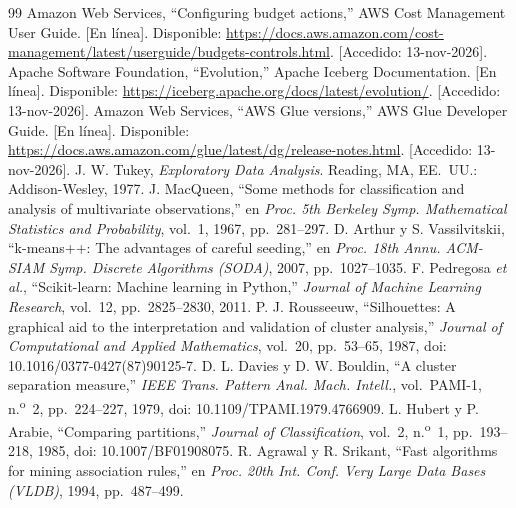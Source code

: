 \begin{thebibliography}{99}
 Amazon Web Services, ``Configuring budget actions,'' AWS Cost Management User Guide. [En línea]. Disponible: \url{https://docs.aws.amazon.com/cost-management/latest/userguide/budgets-controls.html}. [Accedido: 13-nov-2026].
 Apache Software Foundation, ``Evolution,'' Apache Iceberg Documentation. [En línea]. Disponible: \url{https://iceberg.apache.org/docs/latest/evolution/}. [Accedido: 13-nov-2026].
 Amazon Web Services, ``AWS Glue versions,'' AWS Glue Developer Guide. [En línea]. Disponible: \url{https://docs.aws.amazon.com/glue/latest/dg/release-notes.html}. [Accedido: 13-nov-2026].
 J. W. Tukey, \emph{Exploratory Data Analysis}. Reading, MA, EE.~UU.: Addison-Wesley, 1977.
 J. MacQueen, ``Some methods for classification and analysis of multivariate observations,'' en \emph{Proc. 5th Berkeley Symp. Mathematical Statistics and Probability}, vol.~1, 1967, pp.~281--297.
 D. Arthur y S. Vassilvitskii, ``k-means++: The advantages of careful seeding,'' en \emph{Proc. 18th Annu. ACM-SIAM Symp. Discrete Algorithms (SODA)}, 2007, pp.~1027--1035.
 F. Pedregosa \emph{et al.}, ``Scikit-learn: Machine learning in Python,'' \emph{Journal of Machine Learning Research}, vol.~12, pp.~2825--2830, 2011.
 P. J. Rousseeuw, ``Silhouettes: A graphical aid to the interpretation and validation of cluster analysis,'' \emph{Journal of Computational and Applied Mathematics}, vol.~20, pp.~53--65, 1987, doi: 10.1016/0377-0427(87)90125-7.
 D. L. Davies y D. W. Bouldin, ``A cluster separation measure,'' \emph{IEEE Trans. Pattern Anal. Mach. Intell.}, vol.~PAMI-1, n.\textsuperscript{o}~2, pp.~224--227, 1979, doi: 10.1109/TPAMI.1979.4766909.
 L. Hubert y P. Arabie, ``Comparing partitions,'' \emph{Journal of Classification}, vol.~2, n.\textsuperscript{o}~1, pp.~193--218, 1985, doi: 10.1007/BF01908075.
 R. Agrawal y R. Srikant, ``Fast algorithms for mining association rules,'' en \emph{Proc. 20th Int. Conf. Very Large Data Bases (VLDB)}, 1994, pp.~487--499.
\end{thebibliography}
